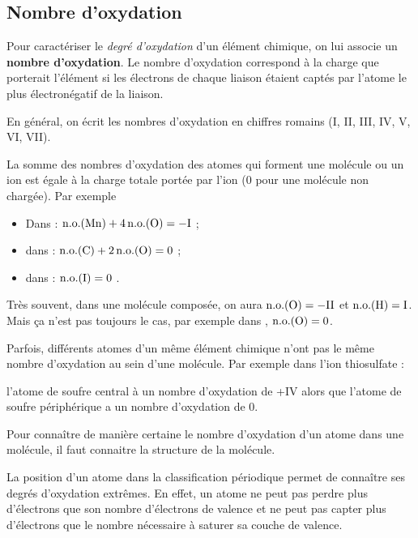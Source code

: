 \documentclass{cours}
\DeclareMathOperator{\NO}{n.o.}
\begin{document}
\subsection{Nombre d'oxydation}%
\label{sub:nombre_d_oxydation}

Pour caractériser le \emph{degré d'oxydation} d'un élément chimique, on lui associe un \textbf{nombre d'oxydation}. Le nombre d'oxydation correspond à la charge que porterait l'élément si les électrons de chaque liaison étaient captés par l'atome le plus électronégatif de la liaison.

En général, on écrit les nombres d'oxydation en chiffres romains (I, II, III, IV, V, VI, VII).

La somme des nombres d'oxydation des atomes qui forment une molécule ou un ion est égale à la charge totale portée par l'ion ($0$ pour une molécule non chargée).
Par exemple 
\begin{itemize}
  \item Dans  : $\NO(\ce{Mn})+4\NO(\ce{O}) = -\text{I}$ ;
  \item dans  : $\NO(\ce{C}) + 2\NO(\ce{O}) = 0$ ;
  \item dans  : $\NO(\ce{I}) = 0$ .
\end{itemize}

Très souvent, dans une molécule composée, on aura $\NO(\ce{O})=-\text{II}$ et $\NO(\ce{H})=\text{I}$. Mais ça n'est pas toujours le cas, par exemple dans , $\NO(\ce{O})=\text{0}$.

Parfois, différents atomes d'un même élément chimique n'ont pas le même nombre d'oxydation au sein d'une molécule. Par exemple dans l'ion thiosulfate :
\begin{center}
\end{center}
l'atome de soufre central à un nombre d'oxydation de +IV alors que l'atome de soufre périphérique a un nombre d'oxydation de 0. 

Pour connaître de manière certaine le nombre d'oxydation d'un atome dans une molécule, il faut connaitre la structure de la molécule.

La position d'un atome dans la classification périodique permet de connaître ses degrés d'oxydation extrêmes. En effet, un atome ne peut pas perdre plus d'électrons que son nombre d'électrons de valence et ne peut pas capter plus d'électrons que le nombre nécessaire à saturer sa couche de valence.
\end{document}
